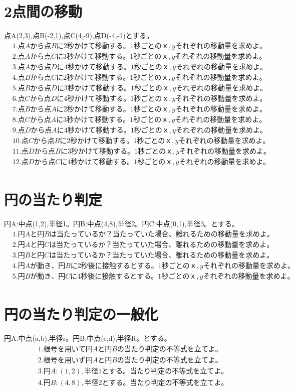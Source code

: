 \documentclass[paper=b4j,landscape,twocolumn,fleqn]{jlreq}
\begin{document}
\section{2点間の移動}
点A(2,3),点B(-2,1),点C(4,-9),点D(-4,-1)とする。
\begin{align*}
　&1.　点Aから点Bに2秒かけて移動する。1秒ごとのｘ,yそれぞれの移動量を求めよ。\\
　&2.　点Aから点Cに3秒かけて移動する。1秒ごとのｘ,yそれぞれの移動量を求めよ。\\
　&3.　点Aから点Dに4秒かけて移動する。1秒ごとのｘ,yそれぞれの移動量を求めよ。\\
　&4.　点Bから点Cに2秒かけて移動する。1秒ごとのｘ,yそれぞれの移動量を求めよ。\\
　&5.　点Bから点Dに3秒かけて移動する。1秒ごとのｘ,yそれぞれの移動量を求めよ。\\
　&6.　点Cから点Dに4秒かけて移動する。1秒ごとのｘ,yそれぞれの移動量を求めよ。\\
　&7.　点Bから点Aに2秒かけて移動する。1秒ごとのｘ,yそれぞれの移動量を求めよ。\\
　&8.　点Cから点Aに3秒かけて移動する。1秒ごとのｘ,yそれぞれの移動量を求めよ。\\
　&9.　点Dから点Aに4秒かけて移動する。1秒ごとのｘ,yそれぞれの移動量を求めよ。\\
　&10.　点Cから点Bに2秒かけて移動する。1秒ごとのｘ,yそれぞれの移動量を求めよ。\\
　&11.　点Dから点Bに3秒かけて移動する。1秒ごとのｘ,yそれぞれの移動量を求めよ。\\
　&12.　点Dから点Cに4秒かけて移動する。1秒ごとのｘ,yそれぞれの移動量を求めよ。\\
\end{align*}
\section{円の当たり判定}
円A:中点(1,2),半径1。円B:中点(4,8),半径2。円C:中点(0,1),半径3。とする。
\begin{align*}
　&1.　円Aと円Bは当たっているか？　当たっていた場合、離れるための移動量を求めよ。\\
　&2.　円Aと円Cは当たっているか？　当たっていた場合、離れるための移動量を求めよ。\\
　&3.　円Bと円Cは当たっているか？　当たっていた場合、離れるための移動量を求めよ。\\
　&4.　円Aが動き、円Bに2秒後に接触するとする。1秒ごとのｘ,yそれぞれの移動量を求めよ。\\
　&5.　円Bが動き、円Cに4秒後に接触するとする。1秒ごとのｘ,yそれぞれの移動量を求めよ。\\
\end{align*}
\section{円の当たり判定の一般化}
円A:中点(a,b),半径r。円B:中点(c,d),半径R。とする。
\begin{align*}
　&1.　根号を用いて円Aと円Bの当たり判定の不等式を立てよ。\\
　&2.　根号を用いず円Aと円Bの当たり判定の不等式を立てよ。\\
　&3.　円A:(1,2),半径1とする。当たり判定の不等式を立てよ。\\
　&4.　円B:(4,8),半径2とする。当たり判定の不等式を立てよ。\\
\end{align*}
\end{document}

